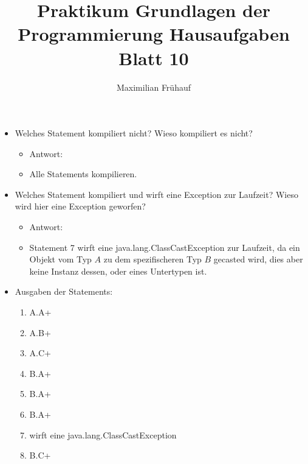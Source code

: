 \documentclass[a4paper, 10pt]{article}
\title{Praktikum Grundlagen der Programmierung Hausaufgaben Blatt 10}
\author{Maximilian Frühauf}
\begin{document}
\maketitle
\begin{itemize}
	\item Welches Statement kompiliert nicht? Wieso kompiliert es nicht?
	      \begin{itemize}
		      \item[] Antwort:
		      \item[] Alle Statements kompilieren.
	      \end{itemize}
	\item Welches Statement kompiliert und wirft eine Exception zur Laufzeit? Wieso wird hier eine Exception geworfen?
	      \begin{itemize}
		      \item[] Antwort:
		      \item[] Statement 7 wirft eine java.lang.ClassCastException zur Laufzeit, da ein Objekt vom
		            Typ \( A \) zu dem spezifischeren Typ \( B \) gecasted wird, dies aber keine Instanz dessen,
		            oder eines Untertypen ist.
	      \end{itemize}
	\item Ausgaben der Statements:
	      \begin{enumerate}
		      \item A.A+
		      \item A.B+
		      \item A.C+
		      \item B.A+
		      \item B.A+
		      \item B.A+
		      \item wirft eine java.lang.ClassCastException
		      \item B.C+
	      \end{enumerate}
\end{itemize}
\end{document}
